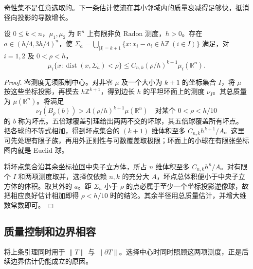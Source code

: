 奇性集不是任意选取的。下一条估计使流在其小邻域内的质量衰减得足够快，抵消径向投影的导数增长。

\begin{lemma}\label{g3:lem:deformation-good-center}
	设 \(0\le k<n\)，\(\mu_1,\mu_2\) 为 \(\mathbb R^n\) 上有限非负 Radon 测度，\(h>0\)。存在 \(a\in(h/4,3h/4)^n\)，使 \(\Sigma_a=\bigcup_{|I|=k+1}\{x:x_i-a_i\in h\mathbb Z\ (i\in I)\}\) 满足，对 \(i=1,2\) 及 \(0<\rho<h\)，
	\begin{equation}\label{g3:eq:good-center-tube}
	\mu_i\{x:\operatorname{dist}(x,\Sigma_a)<\rho\}
	\le C_{n,k}(\rho/h)^{k+1}\mu_i(\mathbb R^n).
	\end{equation}
\end{lemma}
\begin{proof}
	零测度无须限制中心。对非零 \(\mu\) 及一个大小为 \(k+1\) 的坐标集合 \(I\)，将 \(\mu\) 按这些坐标投影，再模去 \(h\mathbb Z^{k+1}\)，得到边长 \(h\) 的平坦环面上的测度 \(\nu_I\)。其总质量为 \(\mu(\mathbb R^n)\)。将满足
	\[
	\nu_I(B_\rho(b))>A(\rho/h)^{k+1}\mu(\mathbb R^n)
	\quad\text{对某个 }0<\rho<h/10
	\]
	的 \(b\) 称为坏点。五倍球覆盖引理给出两两不交的坏球，其五倍球覆盖所有坏点。把各球的不等式相加，得到坏点集合的 \((k+1)\) 维体积至多 \(C_{n,k}h^{k+1}/A\)。这里可先处理有限子族，再用外正则性与可数覆盖取极限；环面上的小球在有限张坐标图内就是 Euclid 球。

	将坏点集合沿其余坐标拉回中央子立方体，所占 \(n\) 维体积至多 \(C_{n,k}h^n/A\)。对有限个 \(I\) 和两项测度取并，选择仅依赖 \(n,k\) 的充分大 \(A\)，坏点总体积便小于中央子立方体的体积。取其外的 \(a\)。距 \(\Sigma_a\) 小于 \(\rho\) 的点必属于至少一个坐标投影逆像球，故把相应良好估计相加即得 \(\rho<h/10\) 时的结论。其余半径用总质量估计，并增大维数常数即可。
\end{proof}

\subsection{质量控制和边界相容}
\label{g3:subsec:2204:02}
将上条引理同时用于 \(\|T\|\) 与 \(\|\partial T\|\)。选择中心时同时照顾这两项测度，正是后续边界估计仍能成立的原因。

